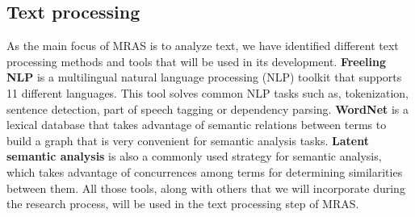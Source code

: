 \documentclass[12pt]{article}
\begin{document}
\subsection{Text processing}
As the main focus of MRAS is to analyze text, we have identified different text processing methods and tools that will be used in its development. \textbf{Freeling NLP} \cite{padro12,padro10b} is a multilingual natural language processing (NLP) toolkit that supports 11 different languages. This tool solves common NLP tasks such as, tokenization, sentence detection, part of speech tagging or dependency parsing. \textbf{WordNet} is a lexical database that takes advantage of semantic relations between terms to build a graph that is very convenient for semantic analysis tasks. \textbf{Latent semantic analysis} is also a commonly used strategy  for semantic analysis, which takes advantage of concurrences among terms for determining similarities between them. All those tools, along with others that we will incorporate during the research process, will be used in the text processing step of MRAS.




\end{document}
